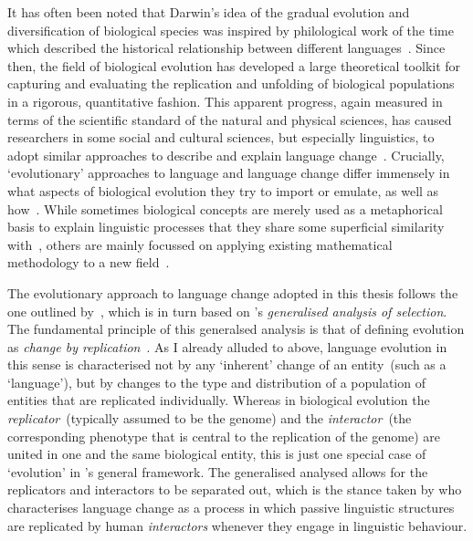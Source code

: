 It has often been noted that Darwin's idea of the gradual evolution and diversification of biological species was inspired by philological work of the time which described the historical relationship between different languages~\citep{Darwin1871}. Since then, the field of biological evolution has developed a large theoretical toolkit for capturing and evaluating the replication and unfolding of biological populations in a rigorous, quantitative fashion. This apparent progress, again measured in terms of the scientific standard of the natural and physical sciences, has caused researchers in some social and cultural sciences, but especially linguistics, to adopt similar approaches to describe and explain language change~\citep[to list just a few monographs]{Croft2000,Blevins2004,McMahon2005,Ritt2009}.
Crucially, `evolutionary' approaches to language and language change differ immensely in what aspects of biological evolution they try to import or emulate, as well as how~\citep{Croft2000}. While sometimes biological concepts are merely used as a metaphorical basis to explain linguistic processes that they share some superficial similarity with~\citep[e.g.][]{Lass1990}, others are mainly focussed on applying existing mathematical methodology to a new field~\citep{BorgerhoffMulder2001,Atkinson2005a,Jager2008,Castellano2009}.

The evolutionary approach to language change adopted in this thesis follows the one outlined by~\citet{Croft2000}, which is in turn based on \citeauthor{Hull1988}'s \emph{generalised analysis of selection}. The fundamental principle of this generalsed analysis is that of defining evolution as \emph{change by replication}~\citep[p.410]{Hull1988}. As I already alluded to above, language evolution in this sense is characterised not by any `inherent' change of an entity~(such as a `language'), but by changes to the type and distribution of a population of entities that are replicated individually. %
Whereas in biological evolution the \emph{replicator}~(typically assumed to be the genome) and the \emph{interactor}~(the corresponding phenotype that is central to the replication of the genome) are united in one and the same biological entity, this is just one special case of `evolution' in \citeauthor{Hull1988}'s general framework. The generalised analysed allows for the replicators and interactors to be separated out, which is the stance taken by \citet{Croft2000} who characterises language change as a process in which passive linguistic structures are replicated by human \emph{interactors} whenever they engage in linguistic behaviour.

